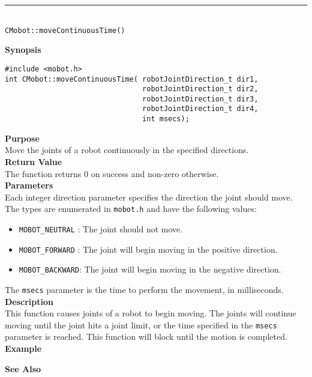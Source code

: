 \noindent
\vspace{5pt}
\rule{4.5in}{0.015in}\\
\noindent
{\LARGE \texttt{CMobot::moveContinuousTime()}}\\
{}

\noindent
{\bf Synopsis}
\begin{verbatim}
#include <mobot.h>
int CMobot::moveContinuousTime( robotJointDirection_t dir1, 
                                robotJointDirection_t dir2, 
                                robotJointDirection_t dir3, 
                                robotJointDirection_t dir4, 
                                int msecs);
\end{verbatim}

\noindent
{\bf Purpose}\\
Move the joints of a robot continuously in the specified directions.\\

\noindent
{\bf Return Value}\\
The function returns 0 on success and non-zero otherwise.\\

\noindent
{\bf Parameters}\\
Each integer direction parameter specifies the direction the joint should move. The types
are enumerated in \texttt{mobot.h} and have the following values:
\begin{itemize}
\item \texttt{MOBOT\_NEUTRAL} : The joint should not move.
\item \texttt{MOBOT\_FORWARD} : The joint will begin moving in the positive direction.
\item \texttt{MOBOT\_BACKWARD}: The joint will begin moving in the negative direction.
\end{itemize}
The \texttt{msecs} parameter is the time to perform the movement, in milliseconds.
\\

\noindent
{\bf Description}\\
This function causes joints of a robot to begin moving. The joints will continue moving
until the joint hits a joint limit, or the time specified in the \texttt{msecs} parameter
is reached. This function will block until the motion is completed.\\

\noindent
{\bf Example}\\
\noindent

\noindent
{\bf See Also}\\

